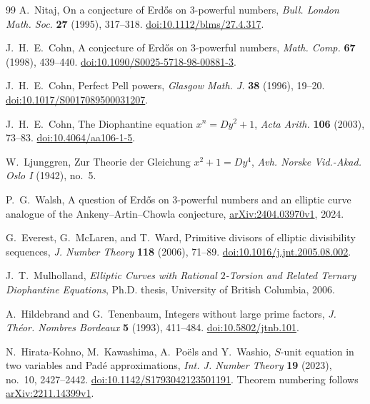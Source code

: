 \documentclass[11pt]{amsart}
\theoremstyle{definition}
\theoremstyle{remark}
\begin{document}
\begin{thebibliography}{99}
A.~Nitaj,
On a conjecture of Erd\H{o}s on $3$-powerful numbers,
\emph{Bull. London Math. Soc.} \textbf{27} (1995), 317--318.
\href{https://doi.org/10.1112/blms/27.4.317}{doi:10.1112/blms/27.4.317}.

J.~H.~E.~Cohn,
A conjecture of Erd\H{o}s on $3$-powerful numbers,
\emph{Math. Comp.} \textbf{67} (1998), 439--440.
\href{https://doi.org/10.1090/S0025-5718-98-00881-3}{doi:10.1090/S0025-5718-98-00881-3}.

J.~H.~E.~Cohn,
Perfect Pell powers,
\emph{Glasgow Math. J.} \textbf{38} (1996), 19--20.
\href{https://doi.org/10.1017/S0017089500031207}{doi:10.1017/S0017089500031207}.

J.~H.~E.~Cohn,
The Diophantine equation $x^n=Dy^2+1$,
\emph{Acta Arith.} \textbf{106} (2003), 73--83.
\href{https://doi.org/10.4064/aa106-1-5}{doi:10.4064/aa106-1-5}.

W.~Ljunggren,
Zur Theorie der Gleichung $x^2+1=Dy^4$,
\emph{Avh. Norske Vid.-Akad. Oslo I} (1942), no.~5.

P.~G.~Walsh,
A question of Erd\H{o}s on $3$-powerful numbers and an elliptic curve
analogue of the Ankeny--Artin--Chowla conjecture,
\href{https://arxiv.org/abs/2404.03970v1}{arXiv:2404.03970v1}, 2024.

G.~Everest, G.~McLaren, and T.~Ward,
Primitive divisors of elliptic divisibility sequences,
\emph{J. Number Theory} \textbf{118} (2006), 71--89.
\href{https://doi.org/10.1016/j.jnt.2005.08.002}%
{doi:10.1016/j.jnt.2005.08.002}.

J.~T.~Mulholland,
\emph{Elliptic Curves with Rational $2$-Torsion and Related Ternary
Diophantine Equations}, Ph.D. thesis, University of British Columbia, 2006.

A.~Hildebrand and G.~Tenenbaum, Integers without large prime factors,
\emph{J. Th\'eor. Nombres Bordeaux} \textbf{5} (1993), 411--484.
\href{https://doi.org/10.5802/jtnb.101}{doi:10.5802/jtnb.101}.

N.~Hirata-Kohno, M.~Kawashima, A.~Po\"els and Y.~Washio,
$S$-unit equation in two variables and Pad\'e approximations,
\emph{Int. J. Number Theory} \textbf{19} (2023), no.~10, 2427--2442.
\href{https://doi.org/10.1142/S1793042123501191}{doi:10.1142/S1793042123501191}.
Theorem numbering follows
\href{https://arxiv.org/abs/2211.14399v1}{arXiv:2211.14399v1}.


\end{thebibliography}
\end{document}
